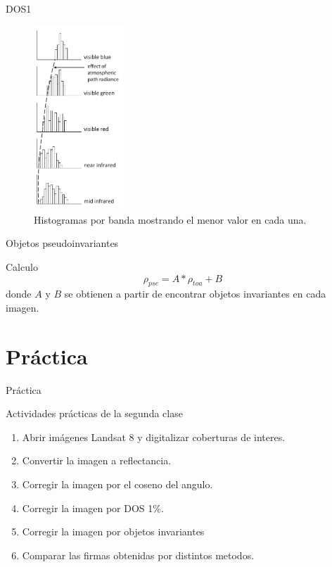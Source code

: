 \documentclass[handout]{beamer}
\begin{document}
\begin{frame}{DOS1}
  \begin{figure}
  \centering
  \includegraphics[width=0.30\textwidth]{imagenes/dos.png}
  \caption{Histogramas por banda mostrando el menor valor en cada una.}
  \end{figure}
\end{frame}

\begin{frame}[fragile]{Objetos pseudoinvariantes}
  \begin{block}{Calculo}
    $$ \rho_{pse} = A * \rho_{toa} + B$$ \pause
    donde $A$ y $B$ se obtienen a partir de encontrar objetos invariantes en cada imagen.
  \end{block}
\end{frame}

\section{Pr\'actica}

\begin{frame}{Pr\'actica}
  \begin{exampleblock}{Actividades pr\'acticas de la segunda clase}
    \begin{enumerate}
      \item Abrir im\'agenes Landsat 8 y digitalizar coberturas de interes.
      \item Convertir la imagen a reflectancia.
      \item Corregir la imagen por el coseno del angulo.
      \item Corregir la imagen por DOS 1\%.
      \item Corregir la imagen por objetos invariantes
      \item Comparar las firmas obtenidas por distintos metodos.
    \end{enumerate}
  \end{exampleblock}
\end{frame}
\end{document}
